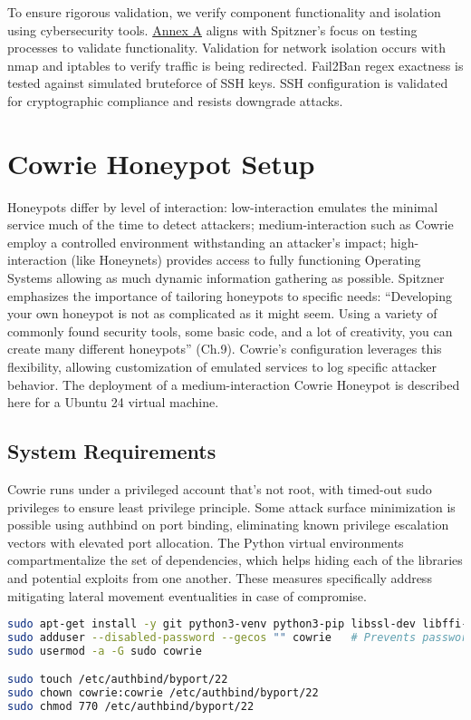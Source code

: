 \documentclass{cls/ULBreport}
\begin{document}
        To ensure rigorous validation, we verify component functionality and isolation using cybersecurity tools. \hyperref[annexes:network]{Annex A} aligns with Spitzner's focus on testing processes to validate functionality. Validation for network isolation occurs with nmap and iptables to verify traffic is being redirected. Fail2Ban regex exactness is tested against simulated bruteforce of SSH keys. SSH configuration is validated for cryptographic compliance and resists downgrade attacks.
        


    \section{Cowrie Honeypot Setup}
    Honeypots differ by level of interaction: low-interaction emulates the minimal service much of the time to detect attackers; medium-interaction such as Cowrie employ a controlled environment withstanding an attacker's impact; high-interaction (like Honeynets) provides access to fully functioning Operating Systems allowing as much dynamic information gathering as possible.
    Spitzner emphasizes the importance of tailoring honeypots to specific needs: \enquote{Developing your own honeypot is not as complicated as it might seem. Using a variety of commonly found security tools, some basic code, and a lot of creativity, you can create many different honeypots} (Ch.9). Cowrie’s configuration leverages this flexibility, allowing customization of emulated services to log specific attacker behavior. The deployment of a medium-interaction Cowrie Honeypot is described here for a Ubuntu 24 virtual machine.
    
\label{sec:cowrie}
    \subsection{System Requirements}
    Cowrie runs under a privileged account that's not root, with timed-out sudo privileges to ensure least privilege principle. Some attack surface minimization is possible using authbind on port binding, eliminating known privilege escalation vectors with elevated port allocation. The Python virtual environments compartmentalize the set of dependencies, which helps hiding each of the libraries and potential exploits from one another. These measures specifically address mitigating lateral movement eventualities in case of compromise. 
    
    \begin{lstlisting}[language=bash,caption={Cowrie User Creation}]
sudo apt-get install -y git python3-venv python3-pip libssl-dev libffi-dev build-essential libpython3-dev authbind
sudo adduser --disabled-password --gecos "" cowrie   # Prevents password-based connections 
sudo usermod -a -G sudo cowrie

sudo touch /etc/authbind/byport/22
sudo chown cowrie:cowrie /etc/authbind/byport/22
sudo chmod 770 /etc/authbind/byport/22
    \end{lstlisting}
\end{document}
